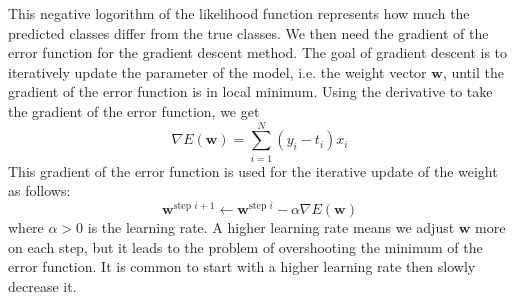     This negative logorithm of the likelihood function represents how much the predicted classes differ from the true classes. We then need the gradient of the error function for the gradient descent method. The goal of gradient descent is to iteratively update the parameter of the model, i.e. the weight vector $\mathbf{w}$, until the gradient of the error function is in local minimum. Using the derivative to take the gradient of the error function, we get
    \[
    \nabla E(\mathbf{w}) = {\displaystyle \sum_{i=1}^{N} (y_i - t_i)x_i}
    \]
    This gradient of the error function is used for the iterative update of the weight as follows:
    \[
    \mathbf{w}^{\text{step } i+1} \leftarrow \mathbf{w}^{\text{step } i} - \alpha \nabla E(\mathbf{w})
    \]
    where $\alpha > 0$ is the learning rate. A higher learning rate means we adjust $\mathbf{w}$ more on each step, but it leads to the problem of overshooting the minimum of the error function. It is common to start with a higher learning rate then slowly decrease it.

